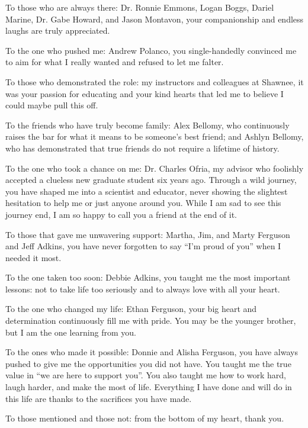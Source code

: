 To those who are always there: Dr. Ronnie Emmons, Logan Boggs, Dariel Marine, Dr. Gabe Howard, and Jason Montavon, your companionship and endless laughs are truly appreciated. 

To the one who pushed me: Andrew Polanco, you single-handedly convinced me to aim for what I really wanted and refused to let me falter. 

To those who demonstrated the role: my instructors and colleagues at Shawnee, it was your passion for educating and your kind hearts that led me to believe I could maybe pull this off. 

To the friends who have truly become family: Alex Bellomy, who continuously raises the bar for what it means to be someone's best friend; and Ashlyn Bellomy, who has demonstrated that true friends do not require a lifetime of history.

To the one who took a chance on me: Dr. Charles Ofria, my advisor who foolishly accepted a clueless new graduate student six years ago.
Through a wild journey, you have shaped me into a scientist and educator, never showing the slightest hesitation to help me or just anyone around you.
While I am sad to see this journey end, I am so happy to call you a friend at the end of it.

To those that gave me unwavering support: Martha, Jim, and Marty Ferguson and Jeff Adkins, you have never forgotten to say ``I'm proud of you'' when I needed it most. 

To the one taken too soon: Debbie Adkins, you taught me the most important lessons: not to take life too seriously and to always love with all your heart. 

To the one who changed my life: Ethan Ferguson, your big heart and determination continuously fill me with pride.
You may be the younger brother, but I am the one learning from you. 

To the ones who made it possible: Donnie and Alisha Ferguson, you have always pushed to give me the opportunities you did not have. 
You taught me the true value in ``we are here to support you''. 
You also taught me how to work hard, laugh harder, and make the most of life. 
Everything I have done and will do in this life are thanks to the sacrifices you have made.

To those mentioned and those not: from the bottom of my heart, thank you.